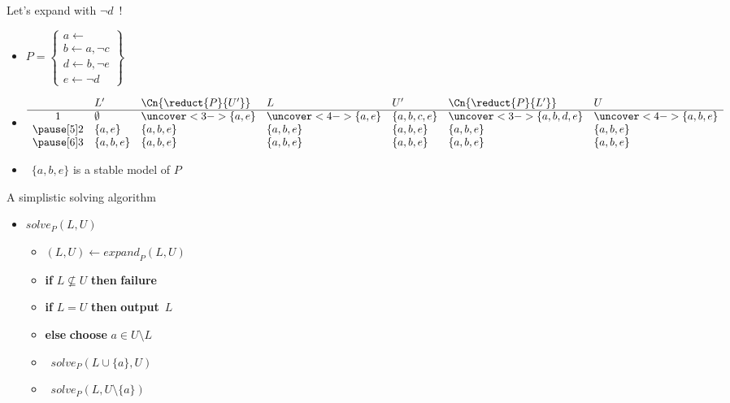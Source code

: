 \begin{frame}{Let's expand with $\neg d$~!}
  \begin{itemize}
  \item<1-> []
    \(
      P
      =
      \left\{
        \begin{array}{l}
          a\leftarrow\\  b\leftarrow a,\neg c\\ d\leftarrow b,\neg e\\ e\leftarrow\neg d
        \end{array}
      \right\}
    \)
  \item<2-> []
    \[
      \begin{array}{cllllll}
        & L'          & \Cn{\reduct{P}{U'}}   & L                     & U'           & \Cn{\reduct{P}{L'}}     & U                     \\
        \hline
        1 & \emptyset &\uncover<3->{\{a,  e\}}&\uncover<4->{\{a,  e\}}& \{a,b,c,e\}  &\uncover<3->{\{a,b,d,e\}}&\uncover<4->{\{a,b,e\}}\\\pause[5]
        2 & \{a,e\}   &             \{a,b,e\} &             \{a,b,e\} & \{a,b,e\}    &             \{a,b,  e\} &             \{a,b,e\} \\\pause[6]
        3 & \{a,b,e\} &             \{a,b,e\} &             \{a,b,e\} & \{a,b,e\}    &             \{a,b,  e\} &             \{a,b,e\}
      \end{array}
    \]
    \medskip
  \item<7->  \ $\{a,b,e\}$ is a stable model of $P$
  \end{itemize}
\end{frame}
\begin{frame}{A simplistic solving algorithm}
  \bigskip
  \begin{itemize}
  \item [] $\mathit{solve}_P(L,U)$
    \smallskip
    \begin{itemize}\normalsize
    \item [] $(L,U)\leftarrow\mathit{expand}_P(L,U)$                         \hfill{}
    \item [] \textbf{if} $L\not\subseteq U$ \textbf{then} \textbf{failure}   \hfill{}
    \item [] \textbf{if} $L =            U$ \textbf{then} \textbf{output}~$L$\hfill{}
    \item [] \textbf{else} \textbf{choose} $a\in U\setminus L$               \hfill{}
    \item [] \qquad\ $\mathit{solve}_P(L\cup\{a\},U              )$
    \item [] \qquad\ $\mathit{solve}_P(L,         U\setminus\{a\})$
    \end{itemize}
  \end{itemize}
\end{frame}
